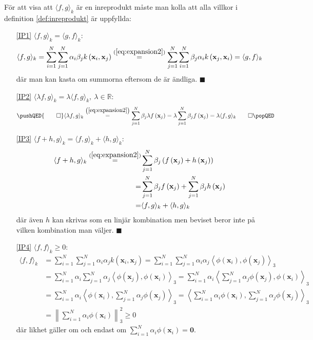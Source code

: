 \documentclass[a4paper, 12pt]{report}
\theoremstyle{definition}
\theoremstyle{remark}
\renewcommand\qedsymbol{$\blacksquare$}
\newcommand{\bfx}{\mathbf{x}}
\begin{document}
För att visa att $\langle f, g \rangle_k$ är en inreprodukt måste man kolla att alla villkor i definition \ref{def:inreprodukt} är uppfyllda:
\begin{enumerate}
	\item[\ref{IP1}] $\langle f, g \rangle_k=\langle g, f \rangle_k$:
	\begin{align*}
		\langle f, g \rangle_k = \sum_{i=1}^{N} \sum_{j=1}^{N} \alpha_i \beta_j k\left(\bfx_i, \bfx_j\right) \overset{(\ref{eq:expansion2})}{=} \sum_{j=1}^{N} \sum_{i=1}^{N}  \beta_j \alpha_i k\left(\bfx_j, \bfx_i\right) = \langle g, f \rangle_k
	\end{align*}
	där man kan kasta om summorna eftersom de är ändliga. \hfill \qedsymbol
	\item[\ref{IP2}] $\langle \lambda f, g \rangle_k=\lambda\langle f, g \rangle_k,~\lambda\in\mathbb{R}$:
	\begin{equation*}
	\pushQED{\qed}
		\langle \lambda f, g \rangle_k	\overset{\left(\ref{eq:expansion2}\right)}{=} \sum_{j=1}^{N} \beta_j \lambda f\left(\bfx_j\right) = \lambda \sum_{j=1}^{N} \beta_j f\left(\bfx_j\right) = \lambda\langle f, g \rangle_k \qedhere
		\popQED
	\end{equation*}
	\item[\ref{IP3}] $\langle f+h, g\rangle_k = \langle f, g\rangle_k + \langle h, g\rangle_k$:
	\begin{align*}
		\langle f+h, g \rangle_k \overset{(\ref{eq:expansion2})}{=} &\sum_{j=1}^{N} \beta_j \left(f\left(\bfx_j\right) + h\left(\bfx_j\right)\right)\\
		= &\sum_{j=1}^{N} \beta_j f\left(\bfx_j\right) + \sum_{j=1}^{N} \beta_j h\left(\bfx_j\right)\\
		= &\langle f, g\rangle_k + \langle h, g\rangle_k
	\end{align*}
	där även $h$ kan skrivas som en linjär kombination men beviset beror inte på vilken kombination man väljer. \hfill \qedsymbol
	\item[\ref{IP4}] $\langle f, f \rangle_k\geq0$:
	\begin{align*}
	\langle f, f \rangle_k &= \sum_{i=1}^{N}\sum_{j=1}^{N}\alpha_i\alpha_jk\left(\bfx_i, \bfx_j\right)
	= \sum_{i=1}^{N}\sum_{j=1}^{N}\alpha_i\alpha_j\left\langle\phi\left(\bfx_i\right),\phi\left(\bfx_j\right)\right\rangle_3\\
	&= \sum_{i=1}^{N}\alpha_i\sum_{j=1}^{N}\alpha_j\left\langle\phi\left(\bfx_j\right),\phi\left(\bfx_i\right)\right\rangle_3
	= \sum_{i=1}^{N}\alpha_i\left\langle\sum_{j=1}^{N}\alpha_j\phi\left(\bfx_j\right),\phi\left(\bfx_i\right)\right\rangle_3\\
	&= \sum_{i=1}^{N}\alpha_i\left\langle\phi\left(\bfx_i\right),\sum_{j=1}^{N}\alpha_j\phi\left(\bfx_j\right)\right\rangle_3
	= \left\langle\sum_{i=1}^{N}\alpha_i\phi\left(\bfx_i\right),\sum_{j=1}^{N}\alpha_j\phi\left(\bfx_j\right)\right\rangle_3\\
	&= \left\|\sum_{i=1}^{N}\alpha_i\phi\left(\bfx_i\right)\right\|_3^2\geq 0
	\end{align*}
	där likhet gäller om och endast om $\sum_{i=1}^{N}\alpha_i\phi\left(\bfx_i\right)=\mathbf{0}$.
	

\end{enumerate}
\end{document}
